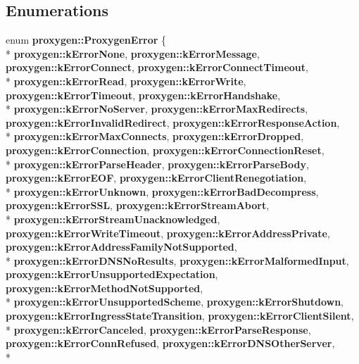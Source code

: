 \subsection*{Enumerations}
\begin{DoxyCompactItemize}
\item 
enum {\bf proxygen\+::\+Proxygen\+Error} \{ \\*
{\bf proxygen\+::k\+Error\+None}, 
{\bf proxygen\+::k\+Error\+Message}, 
{\bf proxygen\+::k\+Error\+Connect}, 
{\bf proxygen\+::k\+Error\+Connect\+Timeout}, 
\\*
{\bf proxygen\+::k\+Error\+Read}, 
{\bf proxygen\+::k\+Error\+Write}, 
{\bf proxygen\+::k\+Error\+Timeout}, 
{\bf proxygen\+::k\+Error\+Handshake}, 
\\*
{\bf proxygen\+::k\+Error\+No\+Server}, 
{\bf proxygen\+::k\+Error\+Max\+Redirects}, 
{\bf proxygen\+::k\+Error\+Invalid\+Redirect}, 
{\bf proxygen\+::k\+Error\+Response\+Action}, 
\\*
{\bf proxygen\+::k\+Error\+Max\+Connects}, 
{\bf proxygen\+::k\+Error\+Dropped}, 
{\bf proxygen\+::k\+Error\+Connection}, 
{\bf proxygen\+::k\+Error\+Connection\+Reset}, 
\\*
{\bf proxygen\+::k\+Error\+Parse\+Header}, 
{\bf proxygen\+::k\+Error\+Parse\+Body}, 
{\bf proxygen\+::k\+Error\+E\+OF}, 
{\bf proxygen\+::k\+Error\+Client\+Renegotiation}, 
\\*
{\bf proxygen\+::k\+Error\+Unknown}, 
{\bf proxygen\+::k\+Error\+Bad\+Decompress}, 
{\bf proxygen\+::k\+Error\+S\+SL}, 
{\bf proxygen\+::k\+Error\+Stream\+Abort}, 
\\*
{\bf proxygen\+::k\+Error\+Stream\+Unacknowledged}, 
{\bf proxygen\+::k\+Error\+Write\+Timeout}, 
{\bf proxygen\+::k\+Error\+Address\+Private}, 
{\bf proxygen\+::k\+Error\+Address\+Family\+Not\+Supported}, 
\\*
{\bf proxygen\+::k\+Error\+D\+N\+S\+No\+Results}, 
{\bf proxygen\+::k\+Error\+Malformed\+Input}, 
{\bf proxygen\+::k\+Error\+Unsupported\+Expectation}, 
{\bf proxygen\+::k\+Error\+Method\+Not\+Supported}, 
\\*
{\bf proxygen\+::k\+Error\+Unsupported\+Scheme}, 
{\bf proxygen\+::k\+Error\+Shutdown}, 
{\bf proxygen\+::k\+Error\+Ingress\+State\+Transition}, 
{\bf proxygen\+::k\+Error\+Client\+Silent}, 
\\*
{\bf proxygen\+::k\+Error\+Canceled}, 
{\bf proxygen\+::k\+Error\+Parse\+Response}, 
{\bf proxygen\+::k\+Error\+Conn\+Refused}, 
{\bf proxygen\+::k\+Error\+D\+N\+S\+Other\+Server}, 
\\*

\end{DoxyCompactItemize}
